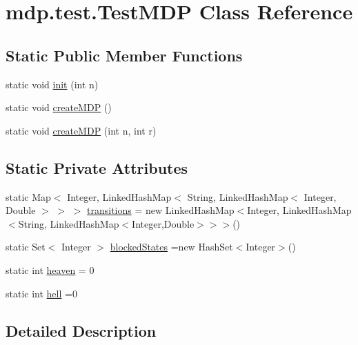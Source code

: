 \hypertarget{classmdp_1_1test_1_1_test_m_d_p}{}\section{mdp.\+test.\+Test\+M\+D\+P Class Reference}
\label{classmdp_1_1test_1_1_test_m_d_p}
\subsection*{Static Public Member Functions}
\begin{DoxyCompactItemize}
\item 
static void \hyperlink{classmdp_1_1test_1_1_test_m_d_p_a08a7593ce16045285a74d8bd9adece7e}{init} (int n)
\item 
static void \hyperlink{classmdp_1_1test_1_1_test_m_d_p_a1cdc2888c8d8d69421bd4be53eb3dd0e}{create\+M\+D\+P} ()
\item 
static void \hyperlink{classmdp_1_1test_1_1_test_m_d_p_a9960e78d7e2628dfd021b55436f3e9ce}{create\+M\+D\+P} (int n, int r)
\end{DoxyCompactItemize}
\subsection*{Static Private Attributes}
\begin{DoxyCompactItemize}
\item 
static Map$<$ Integer, Linked\+Hash\+Map$<$ String, Linked\+Hash\+Map$<$ Integer, Double $>$ $>$ $>$ \hyperlink{classmdp_1_1test_1_1_test_m_d_p_a70b1c8db532b888003b34097b14719e4}{transitions} = new Linked\+Hash\+Map$<$Integer, Linked\+Hash\+Map$<$String, Linked\+Hash\+Map$<$Integer,Double$>$$>$$>$()
\item 
static Set$<$ Integer $>$ \hyperlink{classmdp_1_1test_1_1_test_m_d_p_a3601b951f4080279e402a079cc79ac23}{blocked\+States} =new Hash\+Set$<$Integer$>$()
\item 
static int \hyperlink{classmdp_1_1test_1_1_test_m_d_p_a9bff1df080a8b78a4cd6ed9cf58b2e0e}{heaven} = 0
\item 
static int \hyperlink{classmdp_1_1test_1_1_test_m_d_p_a51658ab02d33480d2e59f2693f82fb5c}{hell} =0
\end{DoxyCompactItemize}


\subsection{Detailed Description}


